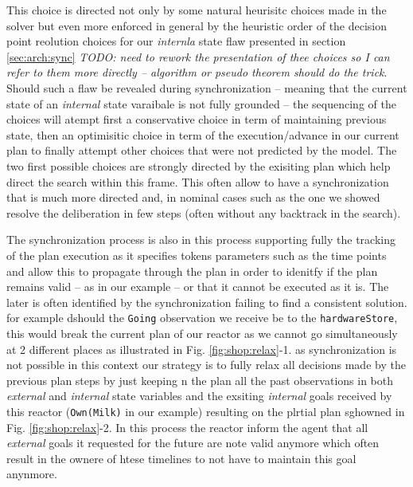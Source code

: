 This choice is directed not only by some natural heurisitc choices
made in the solver but even more enforced in general by the heuristic
order of the decision point reolution choices for our {\em internla}
state flaw presented in section \ref{sec:arch:sync} {\em\color{red}
  TODO: need to rework the presentation of thee choices so I can refer
  to them more directly -- algorithm or pseudo theorem should do the
  trick}. Should such a flaw be revealed during synchronization --
meaning that the current state of an {\em internal} state varaibale is
not fully grounded -- the sequencing of the choices will atempt first
a conservative choice in term of maintaining previous state, then an
optimisitic choice in term of the execution/advance in our current
plan to finally attempt other choices that were not predicted by the
model. The two first possible choices are strongly directed by the
exisiting plan which help direct the search within this frame. This
often allow to have a synchronization that is much more directed and, 
in nominal cases such as the one we showed resolve the deliberation 
in few steps (often without any backtrack in the search).

The synchronization process is also in this process supporting fully
the tracking of the plan execution as it specifies tokens parameters
such as the time points and allow this to propagate through the plan
in order to idenitfy if the plan remains valid -- as in our example --
or that it cannot be executed as it is. The later is often identified
by the synchronization failing to find a consistent solution. for
example dshould the \texttt{Going} observation we receive be to the
\texttt{hardwareStore}, this would break the current plan of our
reactor as we cannot go simultaneously at 2 different places as
illustrated in Fig. \ref{fig:shop:relax}-1. as synchronization is not
possible in this context our strategy is to fully relax all decisions
made by the previous plan steps by just keeping n the plan all the
past observations in both {\em external} and {\em internal} state
variables and the exsiting {\em internal} goals received by this
reactor (\texttt{Own(Milk)} in our example) resulting on the plrtial
plan sghowned in Fig. \ref{fig:shop:relax}-2. In this process the
reactor inform the agent that all {\em external} goals it requested
for the future are note valid anymore which often result in the ownere
of htese timelines to not have to maintain this goal anynmore.

